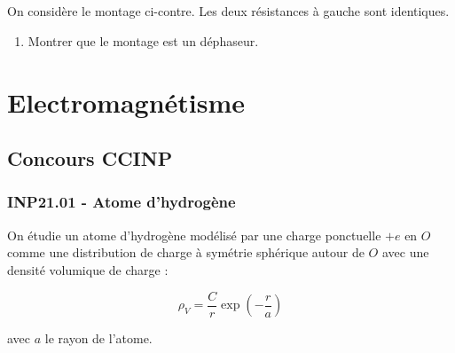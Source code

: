 \begin{minipage}[t]{0.5\textwidth} %

~

\vspace{0em}


\end{minipage}
\hfill %
\begin{minipage}[t]{0.5\textwidth} %

~

\vspace{1em}


On considère le montage ci-contre. Les deux résistances à gauche sont identiques.

\vspace{2em}

\begin{enumerate}
    \item Montrer que le montage est un déphaseur.
\end{enumerate}
\end{minipage}



\newpage
\section*{Electromagnétisme}
\subsection*{Concours CCINP}
\subsubsection*{INP21.01 - Atome d'hydrogène  \lesdeux}

On étudie un atome d'hydrogène modélisé par une charge ponctuelle $+e$ en $O$ comme une distribution de charge à symétrie sphérique autour de $O$ avec une densité volumique de charge :

\[
\rho_V = \frac{C}{r} \exp\left(-\frac{r}{a}\right)
\]

avec $a$ le rayon de l'atome.

